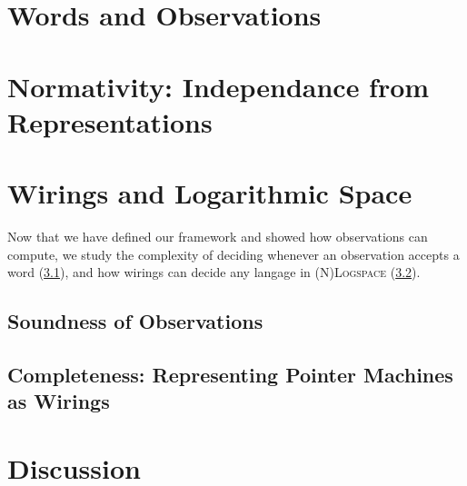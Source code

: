 \section{Words and Observations}\label{sec_words}
	
	
	
\section{Normativity: Independance from Representations}\label{sec_normativity}
	

\section{Wirings and Logarithmic Space}\label{sec_logspace}
	Now that we have defined our framework and showed how observations can compute, we study the complexity of deciding whenever an observation accepts a word (\ref{subsec_soundness}), and how wirings can decide any langage in \textsc{(N)Logspace} (\ref{subsec_completness}).
	\subsection{Soundness of Observations}
	\label{subsec_soundness}
	
	\subsection{Completeness: Representing Pointer Machines as Wirings}
	\label{subsec_completness}
	

\section*{Discussion}





